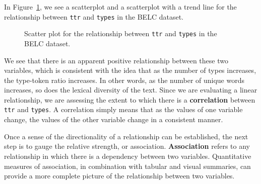 \documentclass[
  letterpaper,
  DIV=11,
  numbers=noendperiod]{scrreport}
\theoremstyle{definition}
\theoremstyle{remark}
\begin{document}
In Figure~\ref{fig-aa-belc-scatter-plot}, we see a scatterplot and a
scatterplot with a trend line for the relationship between \texttt{ttr}
and \texttt{types} in the BELC dataset.

\begin{figure}

\begin{minipage}[t]{0.50\linewidth}

{\centering 


}

\end{minipage}%
%
\begin{minipage}[t]{0.50\linewidth}

{\centering 


}

\end{minipage}%

\caption{\label{fig-aa-belc-scatter-plot}Scatter plot for the
relationship between \texttt{ttr} and \texttt{types} in the BELC
dataset.}

\end{figure}

We see that there is an apparent positive relationship between these two
variables, which is consistent with the idea that as the number of types
increases, the type-token ratio increases. In other words, as the number
of unique words increases, so does the lexical diversity of the text.
Since we are evaluating a linear relationship, we are assessing the
extent to which there is a \textbf{correlation} between \texttt{ttr} and
\texttt{types}. A correlation simply means that as the values of one
variable change, the values of the other variable change in a consistent
manner.

Once a sense of the directionality of a relationship can be established,
the next step is to gauge the relative strength, or association.
\textbf{Association} refers to any relationship in which there is a
dependency between two variables. Quantitative measures of association,
in combination with tabular and visual summaries, can provide a more
complete picture of the relationship between two variables.
\end{document}
